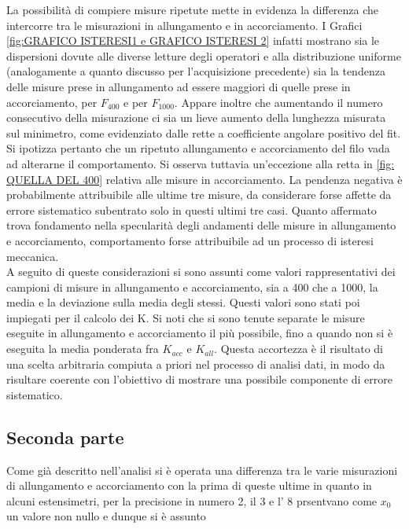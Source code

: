 \documentclass[a4paper,11pt,oneside]{article}
\begin{document}
\begin{figure}[h!]
    \centering
\end{figure}

La possibilità di compiere misure ripetute mette in evidenza la differenza che intercorre tra le misurazioni in allungamento e in accorciamento. I Grafici \ref{fig:GRAFICO ISTERESI1 e GRAFICO ISTERESI 2} infatti mostrano sia le dispersioni dovute alle diverse letture degli operatori e alla distribuzione uniforme (analogamente a quanto discusso per l'acquisizione precedente) sia la tendenza delle misure prese in allungamento ad essere maggiori di quelle prese in accorciamento, per $F_{400}$ e per $F_{1000}$.
Appare inoltre che aumentando il numero consecutivo della misurazione ci sia un lieve aumento della lunghezza misurata sul minimetro, come evidenziato dalle rette a coefficiente angolare positivo del fit. Si ipotizza pertanto che un ripetuto allungamento e accorciamento del filo vada ad alterarne il comportamento. 
Si osserva tuttavia un'eccezione alla retta in \ref{fig: QUELLA DEL 400} relativa alle misure in accorciamento. La pendenza negativa è probabilmente attribuibile alle ultime tre misure, da considerare forse affette da errore sistematico subentrato solo in questi ultimi tre casi. Quanto affermato trova fondamento nella specularità degli andamenti delle misure in allungamento e accorciamento, comportamento forse attribuibile ad un processo di isteresi meccanica.\\
A seguito di queste considerazioni si sono assunti come valori rappresentativi dei campioni di misure in allungamento e accorciamento, sia a 400 che a 1000, la media e la deviazione sulla media degli stessi.
Questi valori sono stati poi impiegati per il calcolo dei K. Si noti che si sono tenute separate le misure eseguite in allungamento e accorciamento il più possibile, fino a quando non si è eseguita la media ponderata  fra $K_{acc}$ e $K_{all}$. Questa accortezza è il risultato di una scelta arbitraria compiuta a priori nel processo di analisi dati, in modo da risultare coerente con l'obiettivo di mostrare una possibile componente di errore sistematico.%


\subsection{Seconda parte}
Come già descritto nell'analisi si è operata una differenza tra le varie misurazioni di allungamento e accorciamento con la prima di queste ultime in quanto in alcuni estensimetri, per la precisione in numero 2, il 3 e l' 8 prsentvano come $x_0$ un valore  non nullo e dunque si è assunto 
\end{document}
